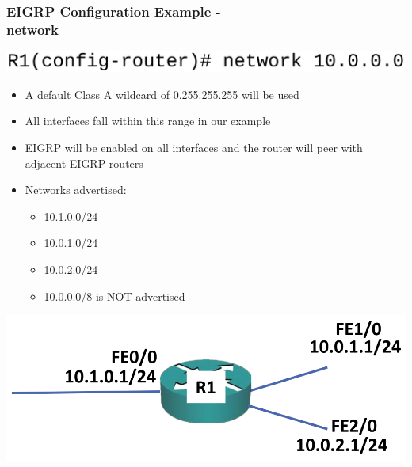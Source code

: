 \documentclass[pdflatex,compress,mathserif]{beamer}
\begin{document}
\begin{frame}
	\frametitle{EIGRP Configuration Example -\\ network}
	\begin{center}
		\includegraphics[width=0.7\linewidth]{img/img14}
	\end{center}
	\begin{itemize}
		\item A default Class A wildcard of 0.255.255.255 will be used
		\item All interfaces fall within this range in our example
		\item EIGRP will be enabled on all interfaces and the router will peer with
adjacent EIGRP routers
	\end{itemize}
	\begin{multicols}{2}
		\begin{itemize}
			\item Networks advertised:
			\begin{itemize}
				\item 10.1.0.0/24
				\item 10.0.1.0/24
				\item 10.0.2.0/24
				\item 10.0.0.0/8 is NOT advertised
			\end{itemize}
		\end{itemize}
		\columnbreak
		\begin{center}
			\includegraphics[width=\linewidth]{img/img15}
		\end{center}
	\end{multicols}
\end{frame}
\end{document}
